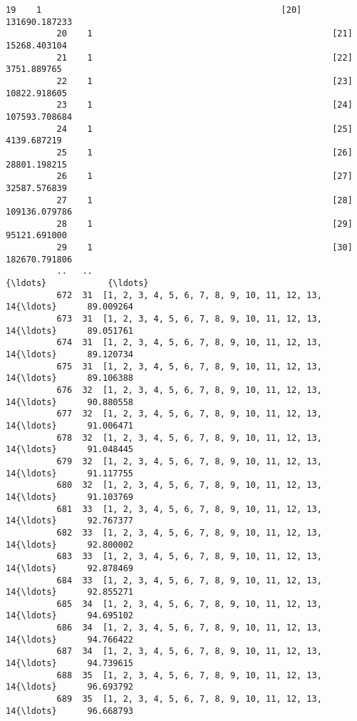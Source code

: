 \documentclass[11pt]{article}
\begin{document}
\begin{Verbatim}[commandchars=\\\{\}]
          19    1                                               [20]  131690.187233
          20    1                                               [21]   15268.403104
          21    1                                               [22]    3751.889765
          22    1                                               [23]   10822.918605
          23    1                                               [24]  107593.708684
          24    1                                               [25]    4139.687219
          25    1                                               [26]   28801.198215
          26    1                                               [27]   32587.576839
          27    1                                               [28]  109136.079786
          28    1                                               [29]   95121.691000
          29    1                                               [30]  182670.791806
          ..   ..                                                {\ldots}            {\ldots}
          672  31  [1, 2, 3, 4, 5, 6, 7, 8, 9, 10, 11, 12, 13, 14{\ldots}      89.009264
          673  31  [1, 2, 3, 4, 5, 6, 7, 8, 9, 10, 11, 12, 13, 14{\ldots}      89.051761
          674  31  [1, 2, 3, 4, 5, 6, 7, 8, 9, 10, 11, 12, 13, 14{\ldots}      89.120734
          675  31  [1, 2, 3, 4, 5, 6, 7, 8, 9, 10, 11, 12, 13, 14{\ldots}      89.106388
          676  32  [1, 2, 3, 4, 5, 6, 7, 8, 9, 10, 11, 12, 13, 14{\ldots}      90.880558
          677  32  [1, 2, 3, 4, 5, 6, 7, 8, 9, 10, 11, 12, 13, 14{\ldots}      91.006471
          678  32  [1, 2, 3, 4, 5, 6, 7, 8, 9, 10, 11, 12, 13, 14{\ldots}      91.048445
          679  32  [1, 2, 3, 4, 5, 6, 7, 8, 9, 10, 11, 12, 13, 14{\ldots}      91.117755
          680  32  [1, 2, 3, 4, 5, 6, 7, 8, 9, 10, 11, 12, 13, 14{\ldots}      91.103769
          681  33  [1, 2, 3, 4, 5, 6, 7, 8, 9, 10, 11, 12, 13, 14{\ldots}      92.767377
          682  33  [1, 2, 3, 4, 5, 6, 7, 8, 9, 10, 11, 12, 13, 14{\ldots}      92.800002
          683  33  [1, 2, 3, 4, 5, 6, 7, 8, 9, 10, 11, 12, 13, 14{\ldots}      92.878469
          684  33  [1, 2, 3, 4, 5, 6, 7, 8, 9, 10, 11, 12, 13, 14{\ldots}      92.855271
          685  34  [1, 2, 3, 4, 5, 6, 7, 8, 9, 10, 11, 12, 13, 14{\ldots}      94.695102
          686  34  [1, 2, 3, 4, 5, 6, 7, 8, 9, 10, 11, 12, 13, 14{\ldots}      94.766422
          687  34  [1, 2, 3, 4, 5, 6, 7, 8, 9, 10, 11, 12, 13, 14{\ldots}      94.739615
          688  35  [1, 2, 3, 4, 5, 6, 7, 8, 9, 10, 11, 12, 13, 14{\ldots}      96.693792
          689  35  [1, 2, 3, 4, 5, 6, 7, 8, 9, 10, 11, 12, 13, 14{\ldots}      96.668793

\end{Verbatim}
\end{document}
